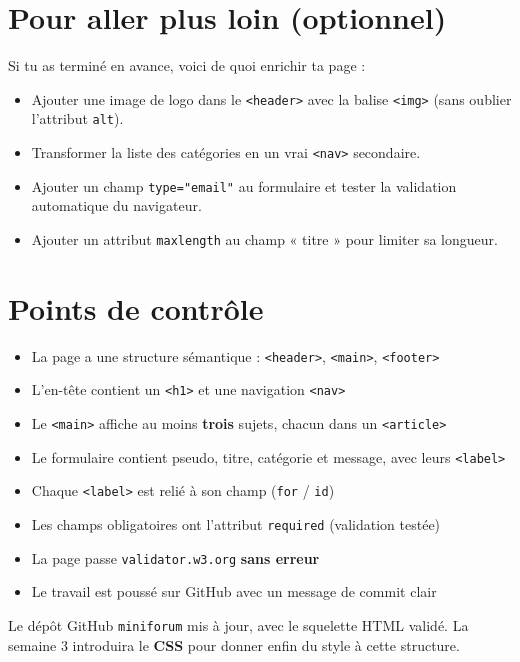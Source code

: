 \documentclass[a4paper,11pt]{article}
\begin{document}
\section{Pour aller plus loin (optionnel)}

Si tu as terminé en avance, voici de quoi enrichir ta page :

\begin{itemize}
  \item Ajouter une image de logo dans le \texttt{<header>} avec la balise \texttt{<img>} (sans oublier l'attribut \texttt{alt}).
  \item Transformer la liste des catégories en un vrai \texttt{<nav>} secondaire.
  \item Ajouter un champ \texttt{type="email"} au formulaire et tester la validation automatique du navigateur.
  \item Ajouter un attribut \texttt{maxlength} au champ « titre » pour limiter sa longueur.
\end{itemize}

\section{Points de contrôle}

\begin{tcolorbox}[definition, title={Auto-évaluation}]
\begin{itemize}
  \item[$\square$] La page a une structure sémantique : \texttt{<header>}, \texttt{<main>}, \texttt{<footer>}
  \item[$\square$] L'en-tête contient un \texttt{<h1>} et une navigation \texttt{<nav>}
  \item[$\square$] Le \texttt{<main>} affiche au moins \textbf{trois} sujets, chacun dans un \texttt{<article>}
  \item[$\square$] Le formulaire contient pseudo, titre, catégorie et message, avec leurs \texttt{<label>}
  \item[$\square$] Chaque \texttt{<label>} est relié à son champ (\texttt{for} / \texttt{id})
  \item[$\square$] Les champs obligatoires ont l'attribut \texttt{required} (validation testée)
  \item[$\square$] La page passe \texttt{validator.w3.org} \textbf{sans erreur}
  \item[$\square$] Le travail est poussé sur GitHub avec un message de commit clair
\end{itemize}
\end{tcolorbox}

\vspace{6pt}
\begin{tcolorbox}[attention, title={À rendre avant la semaine 3}]
Le dépôt GitHub \texttt{miniforum} mis à jour, avec le squelette HTML validé. La semaine 3 introduira le \textbf{CSS} pour donner enfin du style à cette structure.
\end{tcolorbox}
\end{document}
